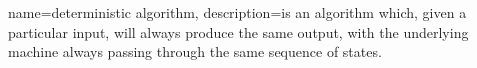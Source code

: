 {
  name=deterministic algorithm,
  description={is an algorithm which, given a particular input,
  		 will always produce the same output, with the 
  		 underlying machine always passing through 
  		 the same sequence of states. }
}

